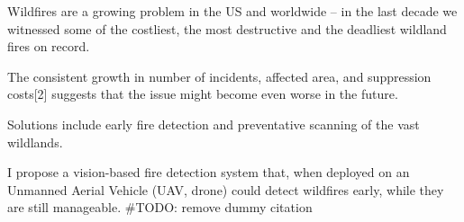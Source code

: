 Wildfires are a growing problem in the US and worldwide -- in the last decade we witnessed some of the costliest, the most destructive and the deadliest wildland fires on record.

The consistent growth in number of incidents, affected area, and suppression costs[2] suggests that the issue
might become even worse in the future.

Solutions include early fire detection and preventative scanning of the vast wildlands.

I propose a vision-based fire detection system that, when deployed on an Unmanned Aerial Vehicle (UAV, drone) could detect wildfires early,
while they are still manageable. \cite{anastasiu-dsaa2016} #TODO: remove dummy citation